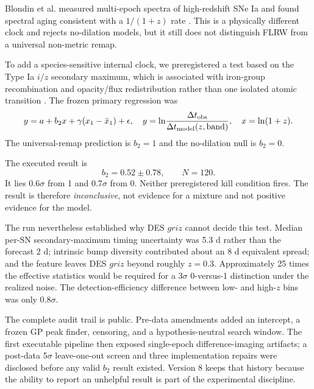 \documentclass[11pt]{article}
\begin{document}
Blondin et al. measured multi-epoch spectra of high-redshift SNe Ia and found spectral aging consistent with a $1/(1+z)$ rate \citep{Blondin2008}. This is a physically different clock and rejects no-dilation models, but it still does not distinguish FLRW from a universal non-metric remap.

To add a species-sensitive internal clock, we preregistered a test based on the Type Ia $i/z$ secondary maximum, which is associated with iron-group recombination and opacity/flux redistribution rather than one isolated atomic transition \citep{Jack2015}. The frozen primary regression was
\begin{equation}
 y=a+b_2x+\gamma(x_1-\bar x_1)+\epsilon,
 \quad
 y=\ln\!\frac{\Delta t_{\rm obs}}{\Delta t_{\rm model}(z,{\rm band})},
 \quad x=\ln(1+z).
 \label{eq:t4}
\end{equation}
The universal-remap prediction is $b_2=1$ and the no-dilation null is $b_2=0$.

The executed result is
\begin{equation}
 \boxed{b_2=0.52\pm0.78,\qquad N=120.}
 \label{eq:t4result}
\end{equation}
It lies 0.6$\sigma$ from 1 and 0.7$\sigma$ from 0. Neither preregistered kill condition fires. The result is therefore \emph{inconclusive}, not evidence for a mixture and not positive evidence for the model.

The run nevertheless established why DES $griz$ cannot decide this test. Median per-SN secondary-maximum timing uncertainty was 5.3 d rather than the forecast 2 d; intrinsic bump diversity contributed about an 8 d equivalent spread; and the feature leaves DES $griz$ beyond roughly $z=0.3$. Approximately 25 times the effective statistics would be required for a 3$\sigma$ 0-versus-1 distinction under the realized noise. The detection-efficiency difference between low- and high-$z$ bins was only 0.8$\sigma$.

The complete audit trail is public. Pre-data amendments added an intercept, a frozen GP peak finder, censoring, and a hypothesis-neutral search window. The first executable pipeline then exposed single-epoch difference-imaging artifacts; a post-data 5$\sigma$ leave-one-out screen and three implementation repairs were disclosed before any valid $b_2$ result existed. Version 8 keeps that history because the ability to report an unhelpful result is part of the experimental discipline.
\end{document}
